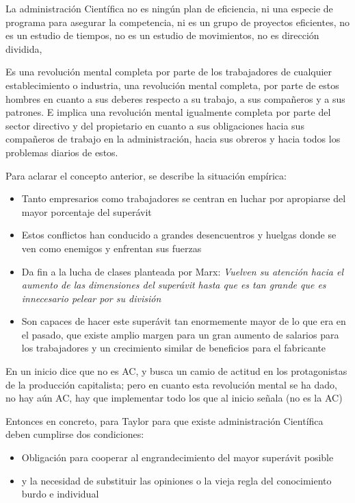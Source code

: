 La administración Científica no es ningún plan de eficiencia, ni una especie de programa para asegurar la competencia, ni es un grupo de proyectos eficientes, no es un estudio de tiempos, no es un estudio de movimientos, no es dirección dividida, 
\begin{definition}
    Es una revolución mental completa por parte de los trabajadores de cualquier establecimiento o industria, una revolución mental completa, por parte de estos hombres en cuanto a sus deberes respecto a su trabajo, a sus compañeros y a sus patrones. E implica una revolución mental igualmente completa por parte del sector directivo y del propietario en cuanto a sus obligaciones hacia sus compañeros de trabajo en la administración, hacia sus obreros y hacia todos los problemas diarios de estos.
\end{definition}
Para aclarar el concepto anterior, se describe la situación empírica:
\begin{itemize}
    \item Tanto empresarios como trabajadores se centran en luchar por apropiarse del mayor porcentaje del superávit
    \item Estos conflictos han conducido a grandes desencuentros y huelgas donde se ven como enemigos y enfrentan sus fuerzas
    \item Da fin a la lucha de clases planteada por Marx: \emph{Vuelven su atención hacia el aumento de las dimensiones del superávit hasta que es tan grande que es innecesario pelear por su división}
    \item Son capaces de hacer este superávit tan enormemente mayor de lo que era en el pasado, que existe amplio margen para un gran aumento de salarios para los trabajadores y un crecimiento similar de beneficios para el fabricante
\end{itemize}
En un inicio dice que no es AC, y busca un camio de actitud en los protagonistas de la producción capitalista; pero en cuanto esta revolución mental se ha dado, no hay aún AC, hay que implementar todo los que al inicio señala (no es la AC)

Entonces en concreto, para Taylor para que existe administración Científica deben cumplirse dos condiciones:
\begin{itemize}
    \item Obligación para cooperar al engrandecimiento del mayor superávit posible 
    \item y la necesidad de substituir las opiniones o la vieja regla del conocimiento burdo e individual
\end{itemize}


